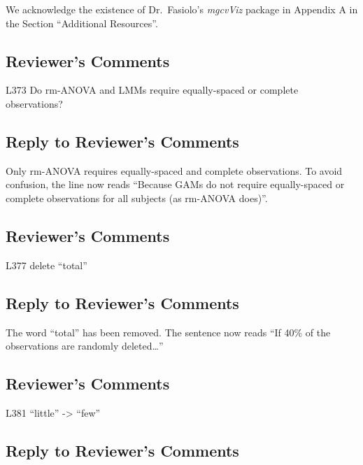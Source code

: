 \documentclass[
]{article}
\begin{document}
We acknowledge the existence of Dr.~Fasiolo's \emph{mgcvViz} package in Appendix A in the Section ``Additional Resources''.

\hypertarget{reviewers-comments-31}{%
\subsection{Reviewer's Comments}\label{reviewers-comments-31}}

L373 Do rm-ANOVA and LMMs require equally-spaced or complete observations?

\hypertarget{section-32}{%
\subsection{\texorpdfstring{\textcolor{reviewersblue} {Reply to Reviewer's Comments}}{}}\label{section-32}}

Only rm-ANOVA requires equally-spaced and complete observations. To avoid confusion, the line now reads ``Because GAMs do not require equally-spaced or complete observations for all subjects (as rm-ANOVA does)''.

\hypertarget{reviewers-comments-32}{%
\subsection{Reviewer's Comments}\label{reviewers-comments-32}}

L377 delete ``total''

\hypertarget{section-33}{%
\subsection{\texorpdfstring{\textcolor{reviewersblue} {Reply to Reviewer's Comments}}{}}\label{section-33}}

The word ``total'' has been removed. The sentence now reads ``If 40\% of the observations are randomly deleted\ldots{}''

\hypertarget{reviewers-comments-33}{%
\subsection{Reviewer's Comments}\label{reviewers-comments-33}}

L381 ``little'' -\textgreater{} ``few''

\hypertarget{section-34}{%
\subsection{\texorpdfstring{\textcolor{reviewersblue} {Reply to Reviewer's Comments}}{}}\label{section-34}}
\end{document}

